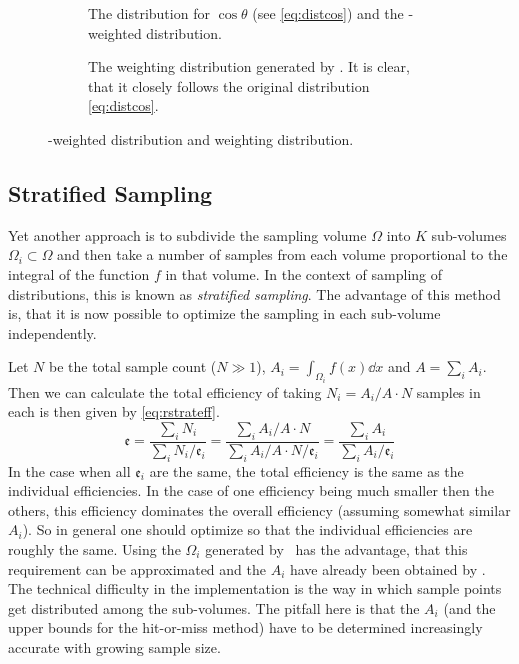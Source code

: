 \begin{figure}[ht]
  \centering
  \begin{subfigure}{.49\textwidth}
    \caption[The distribution for \(\cos\theta\), derived from the
    differential cross-section and the \vegas-weighted
    distribution]{\label{fig:vegasdist} The distribution for
      \(\cos\theta\) (see \cref{eq:distcos}) and the \vegas-weighted
      distribution.}
  \end{subfigure}
  \begin{subfigure}{.49\textwidth}
    \caption[The weighting distribution generated by
    \vegas.]{\label{fig:vegasrho} The weighting distribution generated
      by \vegas. It is clear, that it closely follows the original
      distribution \cref{eq:distcos}.}
  \end{subfigure}
  \caption{\label{fig:vegas-weighting} \vegas-weighted distribution
    and weighting distribution.}
\end{figure}
%


\subsection{Stratified Sampling}
\label{sec:stratsamp-real}

Yet another approach is to subdivide the sampling volume \(\Omega\)
into \(K\) sub-volumes \(\Omega_i\subset\Omega\) and then take a
number of samples from each volume proportional to the integral of the
function \(f\) in that volume. In the context of sampling of
distributions, this is known as \emph{stratified
  sampling}. The advantage of this method is, that it is now possible
to optimize the sampling in each sub-volume independently.

Let \(N\) be the total sample count (\(N\gg 1\)),
\(A_i = \int_{\Omega_i}f(x)\dd{x}\) and \(A=\sum_iA_i\).
Then we can calculate the total efficiency of taking \(N_i=A_i/A \cdot N\)
samples in each is then given by \cref{eq:rstrateff}.
%
\begin{equation}
  \label{eq:rstrateff}
  \mathfrak{e} = \frac{\sum_i N_i}{\sum_i N_i/\mathfrak{e}_i} =
  \frac{\sum_i A_i/A\cdot N}{\sum_i A_i/A\cdot N/ \mathfrak{e}_i} = \frac{\sum_i A_i}{\sum_i A_i/\mathfrak{e}_i}
\end{equation}
%
In the case when all \(\mathfrak{e}_i\) are the same, the total
efficiency is the same as the individual efficiencies. In the case of
one efficiency being much smaller then the others, this efficiency
dominates the overall efficiency (assuming somewhat similar
\(A_i\)). So in general one should optimize so that the individual
efficiencies are roughly the same. Using the \(\Omega_i\) generated by
\vegas\ has the advantage, that this requirement can be approximated
and the \(A_i\) have already been obtained by \vegas. The technical
difficulty in the implementation is the way in which sample points get
distributed among the sub-volumes. The pitfall here is that the
\(A_i\) (and the upper bounds for the hit-or-miss method) have to be
determined increasingly accurate with growing sample size.

